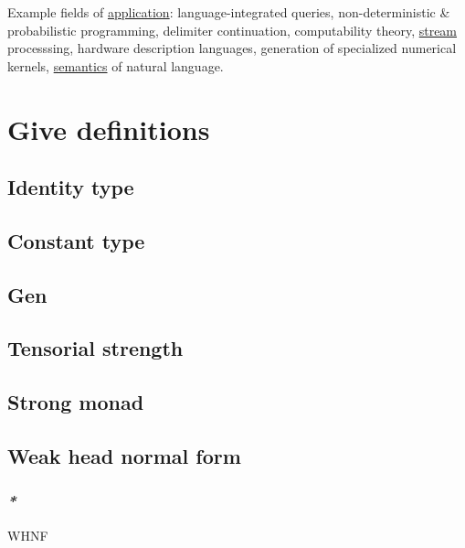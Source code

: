 \documentclass[a4paper,14pt,oneside]{book}
\begin{document}
{Example fields of \hyperref[org623a42d]{application}: language-integrated queries, non-deterministic \& probabilistic programming, delimiter continuation, computability theory, \hyperref[orgf8dc95d]{stream} processsing, hardware description languages, generation of specialized numerical kernels, \hyperref[orgcecfd32]{semantics} of natural language.\\

\part{Give definitions}
\label{sec:org6b64902}


\chapter{\label{org59fefa7}Identity type}
\label{sec:orgf0e0fca}

\chapter{\label{org00eb47b}Constant type}
\label{sec:org0484ec6}

\chapter{\label{org5a9f0a9}Gen}
\label{sec:orgd349400}


\chapter{\label{org57eecfb}Tensorial strength}
\label{sec:orgf214b9b}

\chapter{\label{orgebd419e}Strong monad}
\label{sec:orgb004f21}

\chapter{\label{orgb90f0a6}Weak head normal form}
\label{sec:orga589dd6}

\section{\emph{*}}
\label{sec:org292d57e}

\label{orgc53d609}WHNF\\

}
\end{document}
